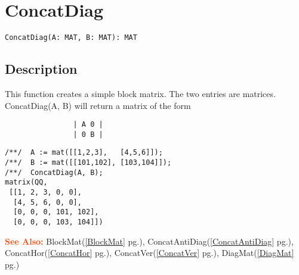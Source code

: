 \documentclass[a4paper]{mybook}
\newenvironment{command}{}{} %
\newcommand\SeeAlso{\par\textcolor{OrangeRed}{\textbf{\large See Also: }}}
\begin{document}
\section{ConcatDiag}
\label{ConcatDiag}
\begin{command} %


\begin{Verbatim}[label=syntax, rulecolor=\color{MidnightBlue},
frame=single]
ConcatDiag(A: MAT, B: MAT): MAT
\end{Verbatim}


\subsection*{Description}

This function creates a simple block matrix.  The two entries are
matrices.
ConcatDiag(A, B) will return a matrix of the form
\begin{verbatim}
                | A 0 |
                | 0 B |
\end{verbatim}
\begin{Verbatim}[label=example, rulecolor=\color{PineGreen}, frame=single]
/**/  A := mat([[1,2,3],   [4,5,6]]);
/**/  B := mat([[101,102], [103,104]]);
/**/  ConcatDiag(A, B);
matrix(QQ,
 [[1, 2, 3, 0, 0],
  [4, 5, 6, 0, 0],
  [0, 0, 0, 101, 102],
  [0, 0, 0, 103, 104]])
\end{Verbatim}


\SeeAlso %
  BlockMat(\ref{BlockMat} pg.\pageref{BlockMat}), 
    ConcatAntiDiag(\ref{ConcatAntiDiag} pg.\pageref{ConcatAntiDiag}), 
    ConcatHor(\ref{ConcatHor} pg.\pageref{ConcatHor}), 
    ConcatVer(\ref{ConcatVer} pg.\pageref{ConcatVer}), 
    DiagMat(\ref{DiagMat} pg.\pageref{DiagMat})
\end{command} %
\end{document}
